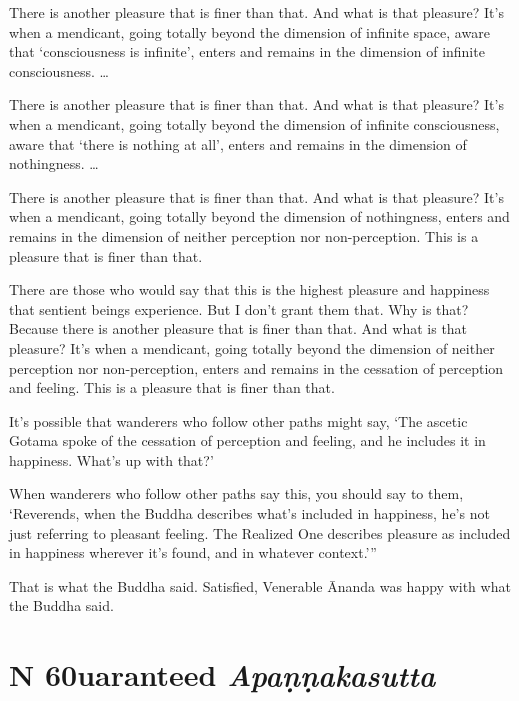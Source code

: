 \documentclass[12pt,openany]{book}%
\newcommand*{\suttatitleacronym}[1]{\smaller[2]{#1}\vspace*{.3em}}
\newcommand*{\suttatitletranslation}[1]{\linebreak{#1}}
\newcommand*{\suttatitleroot}[1]{\linebreak\smaller[2]\itshape{#1}}
\newcommand*{\tocacronym}[1]{\hspace*{-3.3em}{#1}\quad}
\newcommand*{\toctranslation}[1]{#1}
\newcommand*{\tocroot}[1]{(\textit{#1})}
\begin{document}
There is another pleasure that is finer than that. And what is that pleasure? It’s when a mendicant, going totally beyond the dimension of infinite space, aware that ‘consciousness is infinite’, enters and remains in the dimension of infinite consciousness. … 

There is another pleasure that is finer than that. And what is that pleasure? It’s when a mendicant, going totally beyond the dimension of infinite consciousness, aware that ‘there is nothing at all’, enters and remains in the dimension of nothingness. … 

There is another pleasure that is finer than that. And what is that pleasure? It’s when a mendicant, going totally beyond the dimension of nothingness, enters and remains in the dimension of neither perception nor non-perception. This is a pleasure that is finer than that. 

There are those who would say that this is the highest pleasure and happiness that sentient beings experience. But I don’t grant them that. Why is that? Because there is another pleasure that is finer than that. And what is that pleasure? It’s when a mendicant, going totally beyond the dimension of neither perception nor non-perception, enters and remains in the cessation of perception and feeling. This is a pleasure that is finer than that. 

It’s possible that wanderers who follow other paths might say, ‘The ascetic Gotama spoke of the cessation of perception and feeling, and he includes it in happiness. What’s up with that?’ 

When wanderers who follow other paths say this, you should say to them, ‘Reverends, when the Buddha describes what’s included in happiness, he’s not just referring to pleasant feeling. The Realized One describes pleasure as included in happiness wherever it’s found, and in whatever context.’” 

That is what the Buddha said. Satisfied, Venerable Ānanda was happy with what the Buddha said. 

%
\section*{{\suttatitleacronym MN 60}{\suttatitletranslation Guaranteed }{\suttatitleroot Apaṇṇakasutta}}
\addcontentsline{toc}{section}{\tocacronym{MN 60} \toctranslation{Guaranteed } \tocroot{Apaṇṇakasutta}}
\end{document}
